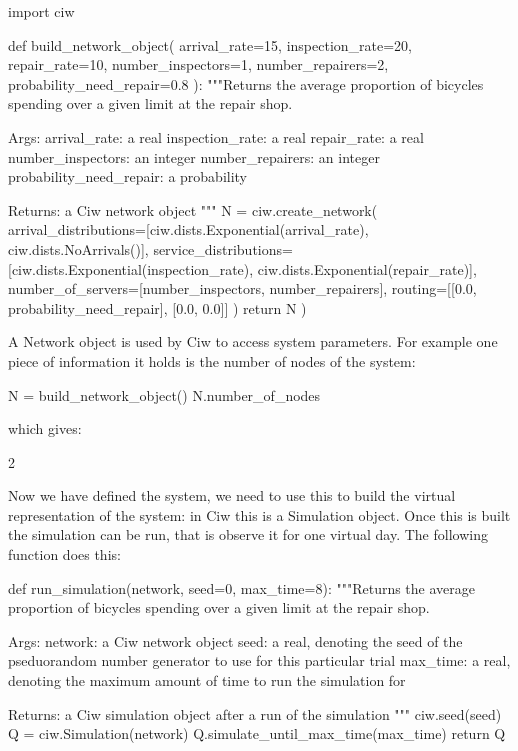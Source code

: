 \begin{pyin}
import ciw

def build_network_object(
    arrival_rate=15,
    inspection_rate=20,
    repair_rate=10,
    number_inspectors=1,
    number_repairers=2,
    probability_need_repair=0.8
):
    """Returns the average proportion of bicycles spending over
    a given limit at the repair shop.
    
    Args:
        arrival_rate: a real
        inspection_rate: a real
        repair_rate: a real
        number_inspectors: an integer
        number_repairers: an integer
        probability_need_repair: a probability
    
    Returns:
        a Ciw network object
    """
    N = ciw.create_network(
        arrival_distributions=[ciw.dists.Exponential(arrival_rate), ciw.dists.NoArrivals()],
        service_distributions=[ciw.dists.Exponential(inspection_rate), ciw.dists.Exponential(repair_rate)],
        number_of_servers=[number_inspectors, number_repairers],
        routing=[[0.0, probability_need_repair], [0.0, 0.0]]
    )
    return N
)
\end{pyin}

A Network object is used by Ciw to access system parameters. For example one piece of information it holds is the number of nodes of the system:

\begin{pyin}
N = build_network_object()
N.number_of_nodes
\end{pyin}

which gives:

\begin{pyout}
2
\end{pyout}

Now we have defined the system, we need to use this to build the virtual
representation of the system: in Ciw this is a Simulation object.
Once this is built the simulation can be run, that is observe it for one
virtual day. The following function does this:

\begin{pyin}
def run_simulation(network, seed=0, max_time=8):
    """Returns the average proportion of bicycles spending over
    a given limit at the repair shop.
    
    Args:
        network: a Ciw network object
        seed: a real, denoting the seed of the pseduorandom
              number generator to use for this particular trial
        max_time: a real, denoting the maximum amount of time
                  to run the simulation for

    Returns:
        a Ciw simulation object after a run of the simulation
    """
    ciw.seed(seed)
    Q = ciw.Simulation(network)
    Q.simulate_until_max_time(max_time)
    return Q
\end{pyin}

